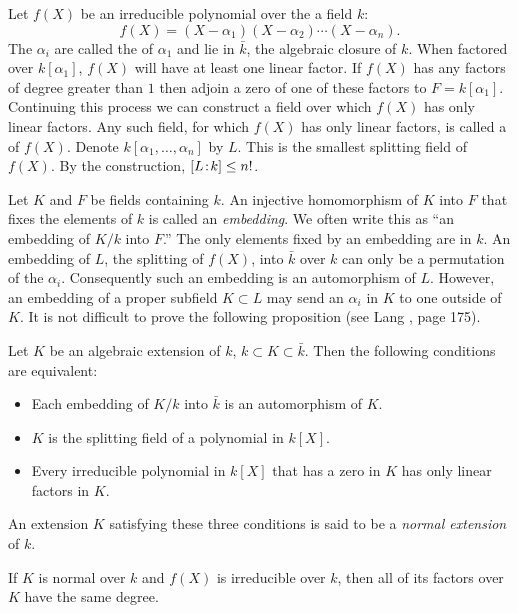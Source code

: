 Let $f(X)$ be an irreducible polynomial over the a field $k$:
\[
f(X) = (X - \alpha_1) (X - \alpha_2) \cdots (X - \alpha_n).
\]
The $\alpha_i$ are called the  of $\alpha_1$ and lie in
$\bar{k}$, the algebraic closure of $k$.  When factored over $k[\alpha_1]$,
$f(X)$ will have at least one linear factor.  If $f(X)$ has any factors of
degree greater than $1$ then adjoin a zero of one of these factors to $F =
k[\alpha_1]$.  Continuing this process we can construct a field over which
$f(X)$ has only linear factors.  Any such field, for which $f(X)$ has only
linear factors, is called a
 of $f(X)$.  Denote $k[\alpha_1, \ldots, \alpha_n]$
by $L$.  This is the smallest splitting field of $f(X)$.  By the
construction, $[L\!:\!k] \le n!$.

Let $K$ and $F$ be fields containing $k$.  An injective homomorphism of $K$
into $F$ that fixes the elements of $k$ is called an {\em
embedding\/}. We often write this as ``an
embedding of $K/k$ into $F$.''  The only elements fixed by an embedding are
in $k$.  An embedding of $L$, the splitting of $f(X)$, into $\bar{k}$ over
$k$ can only be a permutation of the $\alpha_i$.  Consequently such an
embedding is an automorphism of $L$.  However, an embedding of a proper
subfield $K \subset L$ may send an $\alpha_i$ in $K$ to one outside of $K$.
It is not difficult to prove the following proposition (see Lang
\cite{Lang:Algebra}, page 175).

\begin{proposition}
\label{Field:Normality:Prop}
Let $K$ be an algebraic extension of $k$, $k \subset K \subset \bar{k}$.
Then the following conditions are equivalent:
\begin{itemize}
\item Each embedding of $K/k$ into $\bar{k}$ is an automorphism of
$K$.
\item $K$ is the splitting field of a polynomial in $k[X]$.
\item Every irreducible polynomial in $k[X]$ that has a zero in $K$ has
only linear factors in $K$.
\end{itemize}
\end{proposition}

An extension $K$ satisfying these three conditions is said to be a {\em
normal extension} of $k$.

\begin{proposition}
If $K$ is normal over $k$ and $f(X)$ is irreducible over $k$, then all
of its factors over $K$ have the same degree.
\end{proposition}


